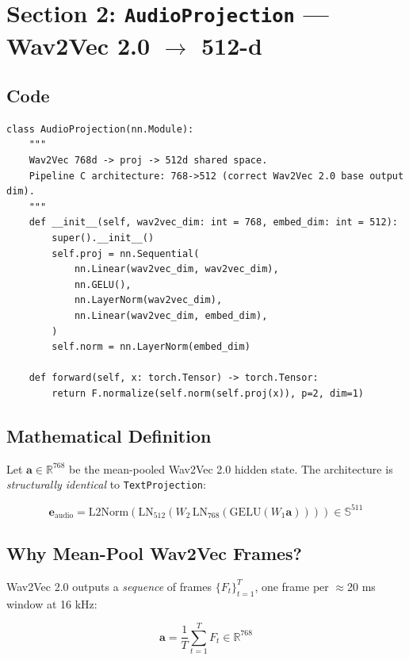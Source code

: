 \documentclass[12pt,a4paper]{article}
\theoremstyle{definition}
\theoremstyle{remark}
\begin{document}
\section{Section 2: \texttt{AudioProjection} — Wav2Vec 2.0 $\to$ 512-d}

\subsection{Code}

\begin{lstlisting}[caption={\texttt{AudioProjection} class}]
class AudioProjection(nn.Module):
    """
    Wav2Vec 768d -> proj -> 512d shared space.
    Pipeline C architecture: 768->512 (correct Wav2Vec 2.0 base output dim).
    """
    def __init__(self, wav2vec_dim: int = 768, embed_dim: int = 512):
        super().__init__()
        self.proj = nn.Sequential(
            nn.Linear(wav2vec_dim, wav2vec_dim),
            nn.GELU(),
            nn.LayerNorm(wav2vec_dim),
            nn.Linear(wav2vec_dim, embed_dim),
        )
        self.norm = nn.LayerNorm(embed_dim)

    def forward(self, x: torch.Tensor) -> torch.Tensor:
        return F.normalize(self.norm(self.proj(x)), p=2, dim=1)
\end{lstlisting}

\subsection{Mathematical Definition}

Let $\mathbf{a} \in \mathbb{R}^{768}$ be the mean-pooled Wav2Vec 2.0 hidden state.
The architecture is \emph{structurally identical} to \texttt{TextProjection}:

\[
  \mathbf{e}_{\text{audio}}
  = \text{L2Norm}\!\left(
    \text{LN}_{512}\!\left(W_2\,
    \text{LN}_{768}\!\left(\text{GELU}(W_1\mathbf{a})\right)\right)\right)
  \in \mathbb{S}^{511}
\]

\subsection{Why Mean-Pool Wav2Vec Frames?}

Wav2Vec 2.0 outputs a \emph{sequence} of frames $\{F_t\}_{t=1}^T$,
one frame per $\approx$20 ms window at 16 kHz:

\[
  \mathbf{a} = \frac{1}{T}\sum_{t=1}^{T} F_t \in \mathbb{R}^{768}
\]
\end{document}
